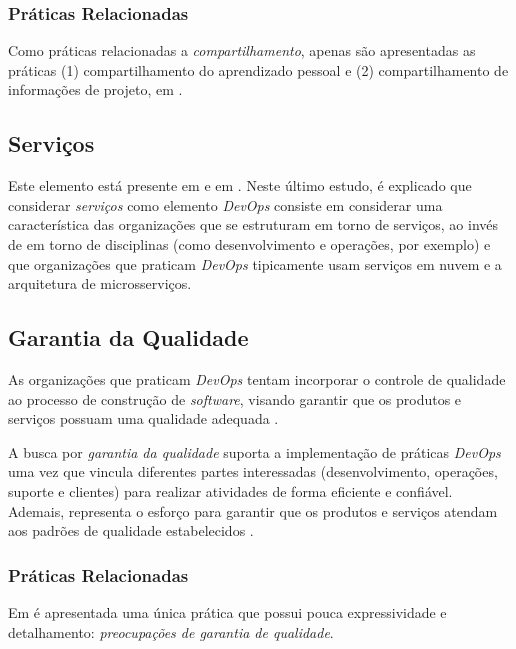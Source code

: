 \subsubsection{Práticas Relacionadas}

Como práticas relacionadas a \emph{compartilhamento}, apenas são apresentadas
as práticas (1) compartilhamento do aprendizado pessoal e (2) compartilhamento
de informações de projeto, em \cite{characterizing_devops}.

\subsection{Serviços}

Este elemento está presente em \cite{cooperation_dev_ops_esem_2014} e em
\cite{qualitative_devops_journalsw_17}. Neste último estudo, é explicado que
considerar \emph{serviços} como elemento \textit{DevOps} consiste em considerar
uma característica das organizações que se estruturam em torno de serviços,
ao invés de em torno de disciplinas (como desenvolvimento e operações, por
exemplo) e que organizações que praticam \textit{DevOps}
tipicamente usam serviços em nuvem e a arquitetura de microsserviços.

\subsection{Garantia da Qualidade}

As organizações que praticam \textit{DevOps} tentam incorporar o controle de
qualidade ao processo de construção de \textit{software}, visando garantir
que os produtos e serviços possuam uma qualidade adequada
\cite{qualitative_devops_journalsw_17}.

A busca por \emph{garantia da qualidade} suporta a implementação de práticas
\textit{DevOps} uma vez que vincula diferentes partes interessadas
(desenvolvimento, operações, suporte e clientes) para realizar atividades de
forma eficiente e confiável. Ademais, representa o esforço para garantir que
os produtos e serviços atendam aos padrões de qualidade estabelecidos
\cite{characterizing_devops}.

\subsubsection{Práticas Relacionadas}

Em \cite{characterizing_devops} é apresentada uma única prática que possui
pouca expressividade e detalhamento: \emph{preocupações de garantia de
qualidade}.

